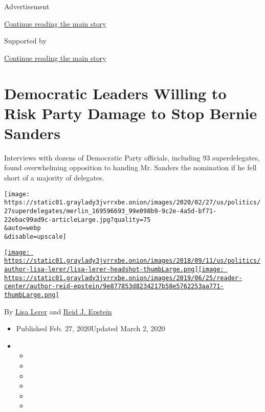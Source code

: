 Advertisement

\protect\hyperlink{after-top}{Continue reading the main story}

Supported by

\protect\hyperlink{after-sponsor}{Continue reading the main story}

\hypertarget{democratic-leaders-willing-to-risk-party-damage-to-stop-bernie-sanders}{%
\section{Democratic Leaders Willing to Risk Party Damage to Stop Bernie
Sanders}\label{democratic-leaders-willing-to-risk-party-damage-to-stop-bernie-sanders}}

Interviews with dozens of Democratic Party officials, including 93
superdelegates, found overwhelming opposition to handing Mr. Sanders the
nomination if he fell short of a majority of delegates.

\texttt{[image: https://static01.graylady3jvrrxbe.onion/images/2020/02/27/us/politics/27superdelegates/merlin\_169596693\_99e098b9-9c2e-4a5d-bf71-22ebac99ad9c-articleLarge.jpg?quality=75\\\&auto=webp\\\&disable=upscale]}

\href{https://www.nytimes3xbfgragh.onion/by/lisa-lerer}{\texttt{[image: https://static01.graylady3jvrrxbe.onion/images/2018/09/11/us/politics/author-lisa-lerer/lisa-lerer-headshot-thumbLarge.png]}}\href{https://www.nytimes3xbfgragh.onion/by/reid-j-epstein}{\texttt{[image: https://static01.graylady3jvrrxbe.onion/images/2019/06/25/reader-center/author-reid-epstein/9e877853d8234217b58e5762253aa771-thumbLarge.png]}}

By \href{https://www.nytimes3xbfgragh.onion/by/lisa-lerer}{Lisa Lerer}
and \href{https://www.nytimes3xbfgragh.onion/by/reid-j-epstein}{Reid J.
Epstein}

\begin{itemize}
\item
  Published Feb. 27, 2020Updated March 2, 2020
\item
  \begin{itemize}
  \item
  \item
  \item
  \item
  \item
  \item
  \end{itemize}
\end{itemize}

